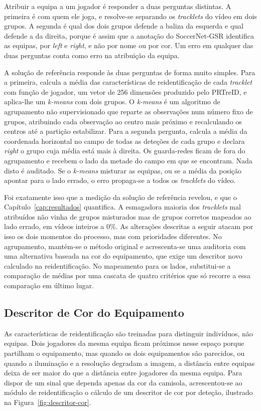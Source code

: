 Atribuir a equipa a um jogador é responder a duas perguntas distintas. A primeira é com quem
ele joga, e resolve-se separando os \emph{tracklets} do vídeo em dois grupos. A segunda é qual
dos dois grupos defende a baliza da esquerda e qual defende a da direita, porque é assim que a
anotação do SoccerNet-GSR identifica as equipas, por \emph{left} e \emph{right}, e não por
nome ou por cor. Um erro em qualquer das duas perguntas conta como erro na atribuição da equipa.

A solução de referência responde às duas perguntas de forma muito simples. Para a primeira,
calcula a média das características de reidentificação de cada \emph{tracklet} com função de
jogador, um vetor de 256 dimensões produzido pelo PRTreID, e aplica-lhe um \emph{k-means} com
dois grupos. O \emph{k-means} é um algoritmo de agrupamento não supervisionado que reparte as
observações num número fixo de grupos, atribuindo cada observação ao centro mais próximo e
recalculando os centros até a partição estabilizar. Para a segunda pergunta, calcula a média da
coordenada horizontal no campo de todas as deteções de cada grupo e declara \emph{right} o grupo
cuja média está mais à direita. Os guarda-redes ficam de fora do agrupamento e recebem o lado
da metade do campo em que se encontram. Nada disto é auditado. Se o \emph{k-means} misturar as
equipas, ou se a média da posição apontar para o lado errado, o erro propaga-se a todos os
\emph{tracklets} do vídeo.

Foi exatamente isso que a medição da solução de referência revelou, e que o Capítulo~\ref{cap:resultados}
quantifica. A esmagadora maioria dos \emph{tracklets} mal atribuídos não vinha de grupos
misturados mas de grupos corretos mapeados ao lado errado, em vídeos inteiros a $0\%$. As
alterações descritas a seguir atacam por isso os dois momentos do processo, mas com prioridades
diferentes. No agrupamento, mantém-se o método original e acrescenta-se uma auditoria com uma
alternativa baseada na cor do equipamento, que exige um descritor novo calculado na
reidentificação. No mapeamento para os lados, substitui-se a comparação de médias por uma cascata
de quatro critérios que só recorre a essa comparação em último lugar.

\subsection{Descritor de Cor do Equipamento}\label{sec:descritor-cor}

As características de reidentificação são treinadas para distinguir indivíduos, não equipas. Dois
jogadores da mesma equipa ficam próximos nesse espaço porque partilham o equipamento, mas quando
os dois equipamentos são parecidos, ou quando a iluminação e a resolução degradam a imagem, a
distância entre equipas deixa de ser maior do que a distância entre jogadores da mesma equipa. Para
dispor de um sinal que dependa apenas da cor da camisola, acrescentou-se ao módulo de
reidentificação o cálculo de um descritor de cor por deteção, ilustrado na
Figura~\ref{fig:descritor-cor}.

